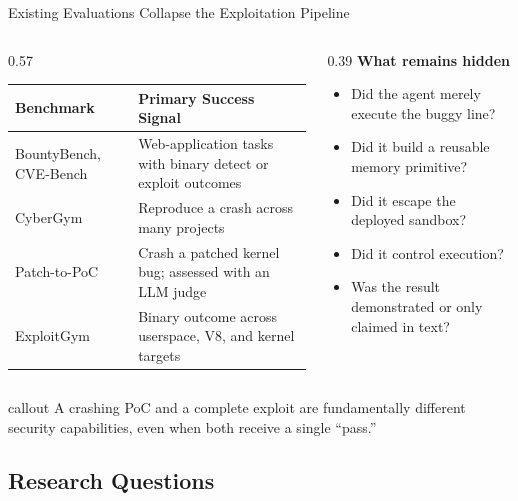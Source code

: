 \documentclass[aspectratio=169,t]{beamer}
\newcommand{\callout}[1]{%
  \vspace{0.45em}%
  \begin{beamercolorbox}[wd=\linewidth,sep=0.55em,rounded=false]{callout}
    #1
  \end{beamercolorbox}%
  \vspace{0.35em}%
}
\begin{document}
\begin{frame}{Existing Evaluations Collapse the Exploitation Pipeline}
  \begin{columns}[T,onlytextwidth]
    \begin{column}{0.57\textwidth}
      \small
      \renewcommand{\arraystretch}{1.22}
      \begin{tabularx}{\linewidth}{@{}>{\raggedright\arraybackslash}p{2.4cm}>{\raggedright\arraybackslash}X@{}}
        \toprule
        \textbf{Benchmark} & \textbf{Primary Success Signal} \\
        \midrule
        BountyBench, CVE-Bench & Web-application tasks with binary detect or exploit outcomes \\
        CyberGym & Reproduce a crash across many projects \\
        Patch-to-PoC & Crash a patched kernel bug; assessed with an LLM judge \\
        ExploitGym & Binary outcome across userspace, V8, and kernel targets \\
        \bottomrule
      \end{tabularx}
    \end{column}
    \begin{column}{0.39\textwidth}
      \textbf{What remains hidden}\par
      \begin{itemize}\small
        \item Did the agent merely execute the buggy line?
        \item Did it build a reusable memory primitive?
        \item Did it escape the deployed sandbox?
        \item Did it control execution?
        \item Was the result demonstrated or only claimed in text?
      \end{itemize}
    \end{column}
  \end{columns}

  \vfill
  \callout{A crashing PoC and a complete exploit are fundamentally different security capabilities, even when both receive a single ``pass.''}
\end{frame}

\subsection{Research Questions}
\end{document}
